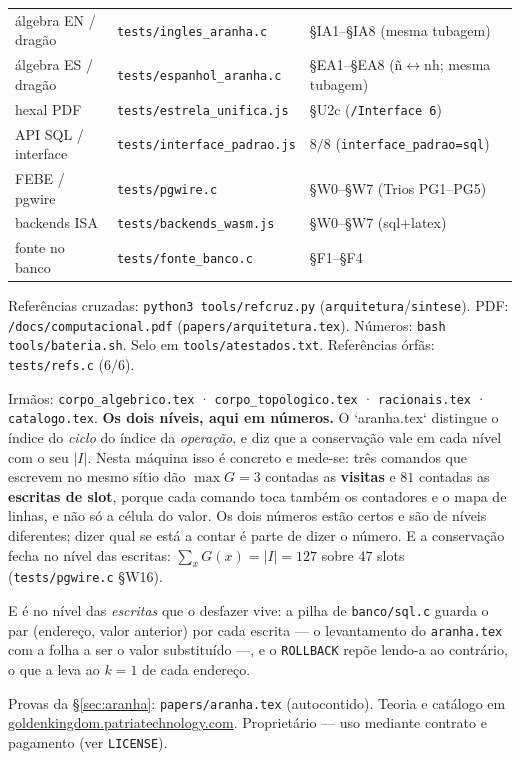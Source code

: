 \documentclass[11pt,a4paper]{article}
\newcommand{\code}[1]{\texttt{\small #1}}
\newcommand{\abs}[1]{\lvert #1\rvert}
\begin{document}
\begin{center}
\begin{tabular}{@{}lll@{}}
álgebra EN / dragão & \code{tests/ingles\_aranha.c} & §IA1--§IA8 (mesma tubagem) \\
álgebra ES / dragão & \code{tests/espanhol\_aranha.c} & §EA1--§EA8 (ñ$\leftrightarrow$nh; mesma tubagem) \\
hexal PDF & \code{tests/estrela\_unifica.js} & §U2c (\code{/Interface~6}) \\
API SQL / interface & \code{tests/interface\_padrao.js} & $8/8$ (\code{interface\_padrao=sql}) \\
FEBE / pgwire & \code{tests/pgwire.c} & §W0--§W7 (Trios PG1--PG5) \\
backends ISA & \code{tests/backends\_wasm.js} & §W0--§W7 (sql+latex) \\
fonte no banco & \code{tests/fonte\_banco.c} & §F1--§F4 \\
\bottomrule
\end{tabular}
\end{center}

\medskip\noindent Referências cruzadas: \code{python3 tools/refcruz.py}
(\code{arquitetura}/\code{sintese}). PDF: \code{/docs/computacional.pdf}
(\code{papers/arquitetura.tex}). Números: \code{bash tools/bateria.sh}.
Selo em \code{tools/atestados.txt}. Referências órfãs: \code{tests/refs.c} ($6/6$).

\vfill
{\footnotesize\color{cinza}\noindent
Irmãos: \code{corpo\_algebrico.tex} · \code{corpo\_topologico.tex} ·
\code{racionais.tex} · \code{catalogo.tex}.
\medskip\noindent\textbf{Os dois níveis, aqui em números.} O `aranha.tex`
distingue o índice do \emph{ciclo} do índice da \emph{operação}, e diz que a
conservação vale em cada nível com o seu $\abs{I}$. Nesta máquina isso é
concreto e mede-se: três comandos que escrevem no mesmo sítio dão
$\max G = 3$ contadas as \textbf{visitas} e $81$ contadas as \textbf{escritas de
slot}, porque cada comando toca também os contadores e o mapa de linhas, e não
só a célula do valor. Os dois números estão certos e são de níveis diferentes;
dizer qual se está a contar é parte de dizer o número. E a conservação fecha no
nível das escritas: $\sum_x G(x) = \abs{I} = 127$ sobre $47$ slots
(\code{tests/pgwire.c} §W16).

\medskip\noindent E é no nível das \emph{escritas} que o desfazer vive: a pilha
de \code{banco/sql.c} guarda o par (endereço, valor anterior) por cada escrita
--- o levantamento do \code{aranha.tex} com a folha a ser o valor substituído
---, e o \code{ROLLBACK} repõe lendo-a ao contrário, o que a leva ao $k=1$ de
cada endereço.

Provas da §\ref{sec:aranha}: \code{papers/aranha.tex} (autocontido). Teoria e catálogo em
\href{https://goldenkingdom.patriatechnology.com}{goldenkingdom.patriatechnology.com}.
Proprietário --- uso mediante contrato e pagamento (ver \texttt{LICENSE}).\par}
\end{document}
